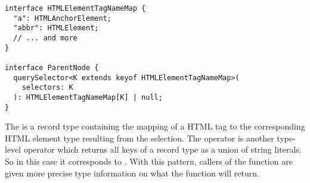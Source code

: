 \begin{lstlisting}
interface HTMLElementTagNameMap {
  "a": HTMLAnchorElement;
  "abbr": HTMLElement;
  // ... and more
}

interface ParentNode {
  querySelector<K extends keyof HTMLElementTagNameMap>(
    selectors: K
  ): HTMLElementTagNameMap[K] | null;
}
\end{lstlisting}

The  is a record type containing the mapping of a HTML tag to the corresponding HTML element type resulting from the selection. The  operator is another type-level operator which returns all keys of a record type as a union of string literals. So in this case it corresponds to  . With this pattern, callers of the  function are given more precise type information on what the function will return.
